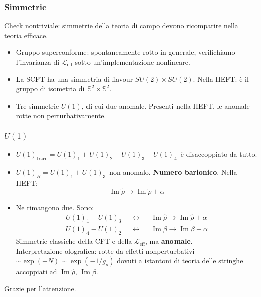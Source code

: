 \documentclass[aspectratio=43,mathserif]{beamer}
\newcommand{\ess}{\mathbb{S}}
\newcommand{\hatt}[1]{\ensuremath{\widehat{#1}}}
\newcommand{\tildd}[1]{\ensuremath{\widetilde{#1}}}
\renewcommand{\Im}{\ensuremath{\operatorname{Im}}}
\newcommand{\leff}{\ensuremath{\mathcal{L}_\text{eff}}}
\begin{document}
\begin{frame}
	\frametitle{Simmetrie}
	Check nontriviale: simmetrie della teoria di campo devono ricomparire nella teoria efficace. 
	\begin{itemize}
		\vfill\item Gruppo superconforme: spontaneamente rotto in generale, verifichiamo l'invarianza di $\leff$ sotto un'implementazione nonlineare.
		\vfill\item La SCFT ha una simmetria di flavour $SU(2)\times SU(2)$. Nella HEFT: è il gruppo di isometria di $\ess^2 \times \ess^2$.
		\vfill\item Tre simmetrie $U(1)$, di cui due anomale. Presenti nella HEFT, le anomale rotte non perturbativamente.
	\end{itemize}
\end{frame}


\begin{frame}
	\frametitle{$U(1)$}

	\begin{itemize}
		\vfill\item \small$U(1)_\text{trace} = U(1)_1 + U(1)_2 + U(1)_3 + U(1)_4$\normalsize \, è disaccoppiato da tutto.
		\vfill\item \small$U(1)_B = U(1)_1 + U(1)_3$\normalsize \, non anomalo. \textbf{Numero barionico}. Nella HEFT:
			\begin{equation}
				\Im \tildd \rho \rightarrow \Im \tildd \rho + \alpha
				\label{}
			\end{equation}

		\vfill\vspace{-2pt}\item Ne rimangono due. Sono: \vspace{-4pt}
			\begin{align}
				U(1)_1 - U(1)_3 &&\leftrightarrow && \Im \hatt \rho \rightarrow \Im \hatt \rho + \alpha\\
				U(1)_4 - U(1)_2 &&\leftrightarrow &&\Im\beta \rightarrow \Im\beta + \alpha
			\end{align}
			Simmetrie classiche della CFT e della $\leff$, ma \textbf{anomale}.\\ Interpretazione olografica: rotte da effetti nonperturbativi $\sim \exp(-N) \sim \exp(-1/g_s)$ dovuti a istantoni di teoria delle stringhe accoppiati ad $\Im\hatt\rho$, $\Im\beta$.

	\end{itemize}
\end{frame}

\begin{frame}
	\begin{center}
		Grazie per l'attenzione.
	\end{center}
\end{frame}
\end{document}
